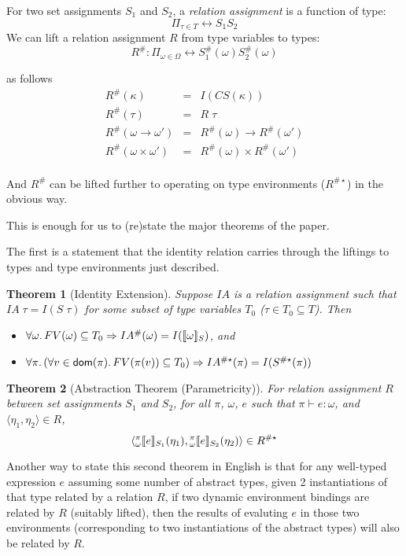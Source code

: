 \documentclass{article}
\newtheorem{theorem}{Theorem}
\begin{document}
For two set assignments $S_1$ and $S_2$, a \emph{relation assignment} is a function of type:
\[
    \Pi_{\tau\in T}\rel{S_1}{S_2}
\]
We can lift a relation assignment $R$ from type variables to types:
\[
    R^{\#} : 
    \Pi_{\omega\in\Omega}\rel{S_1^{\#}(\omega)}{S_2^{\#}(\omega)}
\]

as follows
\[
    \begin{array}{rcl}
    R^{\#}(\kappa) & = & I(CS(\kappa))\\
    R^{\#}(\tau) & = & R\;\tau\\
    R^{\#}(\omega\rightarrow\omega') & = & R^{\#}(\omega)\rightarrow R^{\#}(\omega')\\
    R^{\#}(\omega\times\omega') & = & R^{\#}(\omega)\times R^{\#}(\omega')\\
    \end{array}
\]

And $R^{\#}$ can be lifted further to operating on type environments ($R^{\#\star}$) in the obvious
way.

This is enough for us to (re)state the major theorems of the paper.

The first is a statement that the identity relation carries through the liftings to types and type
environments just described.
\begin{theorem}[Identity Extension]
Suppose $IA$ is a relation assignment such that $IA\;\tau=I(S\;\tau)$ for some subset of type
variables $T_0$ ($\tau\in
T_0\subseteq T$).  Then
\begin{itemize}
\item $\forall \omega\ldotp FV(\omega)\subseteq T_0 \Rightarrow IA^{\#}(\omega) = I(\llbracket \omega \rrbracket_{S})$, and
\item $\forall \pi\ldotp (\forall v\in\mathsf{dom}(\pi)\ldotp FV(\pi(v))\subseteq T_0) \Rightarrow
        IA^{\#\star}(\pi) = I(S^{\#\star}(\pi))$
\end{itemize}
\end{theorem}

\begin{theorem}[Abstraction Theorem (Parametricity)]
For relation assignment $R$ between set assignments $S_1$ and $S_2$, 
for all $\pi$, $\omega$, $e$ such that $\pi\vdash e : \omega$, and 
$\langle \eta_1, \eta_2\rangle\in R$,
\[
    \langle
    {}^{\pi}_{\omega}\llbracket e\rrbracket_{S_1}(\eta_1)
    ,
    {}^{\pi}_{\omega}\llbracket e\rrbracket_{S_2}(\eta_2)
    \rangle
    \in R^{\#\star}
\]
\end{theorem}

Another way to state this second theorem in English is that for any well-typed expression $e$ assuming
some number of abstract types, given 2 instantiations of that type related by a relation $R$, if
two dynamic environment bindings are related by $R$ (suitably lifted), then the results of evaluting
$e$ in those two environments (corresponding to two instantiations of the abstract types) will also
be related by $R$.
\end{document}
